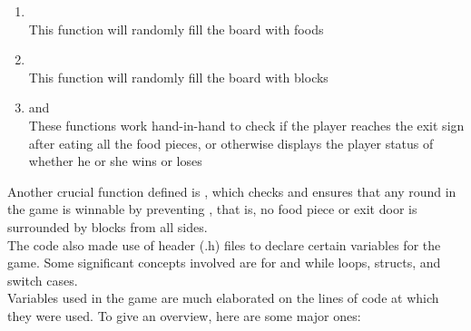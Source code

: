 \begin{enumerate}
    \item {}\\
    \hspace{1em} This function will randomly fill the board with foods
    \item {}\\
    \hspace{1em} This function will randomly fill the board with blocks
    \item {} and \\
    \hspace{1em} These functions work hand-in-hand to check if the player reaches the exit sign after eating all the food pieces,
    or otherwise displays the player status of whether he or she wins or loses
\end{enumerate}

Another crucial function defined is
, which checks and ensures that any
round in the game is winnable by preventing
, that is, no food piece or exit door
is surrounded by blocks from all sides.\\

The code also made use of header (.h) files to declare certain variables for
the game. Some significant concepts involved are for and while loops, structs, and
switch cases.\\

Variables used in the game are much elaborated on the lines of code at which they were used. To give an overview, here are some major ones:\\

